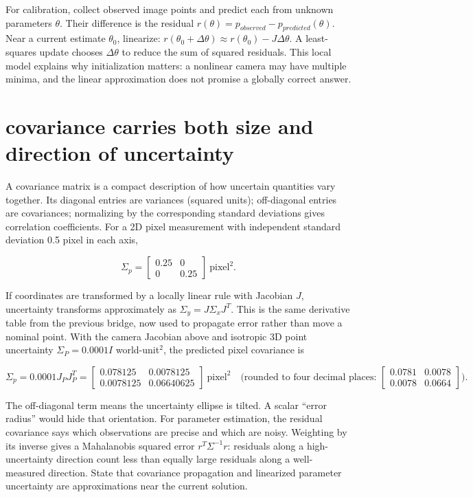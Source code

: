 For calibration, collect observed image points and predict each from unknown parameters \(\theta\). Their difference is the residual \(r(\theta)=p_{observed}-p_{predicted}(\theta)\). Near a current estimate \(\theta_0\), linearize: \(r(\theta_0+\Delta\theta)\approx r(\theta_0)-J\Delta\theta\). A least-squares update chooses \(\Delta\theta\) to reduce the sum of squared residuals. This local model explains why initialization matters: a nonlinear camera may have multiple minima, and the linear approximation does not promise a globally correct answer.

\section{covariance carries both size and direction of uncertainty}\label{02-foundations-ii-ch034-covariance-carries-both-size-and-direction-of-uncertainty}

A covariance matrix is a compact description of how uncertain quantities vary together. Its diagonal entries are variances (squared units); off-diagonal entries are covariances; normalizing by the corresponding standard deviations gives correlation coefficients. For a 2D pixel measurement with independent standard deviation 0.5 pixel in each axis,

\[\Sigma_p=\begin{bmatrix}0.25&0\\0&0.25\end{bmatrix}\ \text{pixel}^2.\]

If coordinates are transformed by a locally linear rule with Jacobian \(J\), uncertainty transforms approximately as \(\Sigma_y=J\Sigma_xJ^T\). This is the same derivative table from the previous bridge, now used to propagate error rather than move a nominal point. With the camera Jacobian above and isotropic 3D point uncertainty \(\Sigma_P=0.0001I\) world-unit\(^2\), the predicted pixel covariance is

\[\Sigma_p=0.0001J_PJ_P^T=\begin{bmatrix}0.078125&0.0078125\\0.0078125&0.06640625\end{bmatrix}\ \text{pixel}^2\quad\text{(rounded to four decimal places: }\begin{bmatrix}0.0781&0.0078\\0.0078&0.0664\end{bmatrix}).\]

The off-diagonal term means the uncertainty ellipse is tilted. A scalar ``error radius'' would hide that orientation. For parameter estimation, the residual covariance says which observations are precise and which are noisy. Weighting by its inverse gives a Mahalanobis squared error \(r^T\Sigma^{-1}r\): residuals along a high-uncertainty direction count less than equally large residuals along a well-measured direction. State that covariance propagation and linearized parameter uncertainty are approximations near the current solution.

